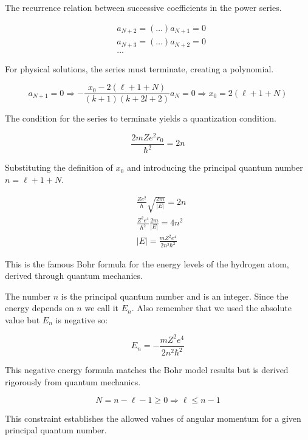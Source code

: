 The recurrence relation between successive coefficients in the power series.

\begin{align}
& a_{N+2}=(\ldots) a_{N+1}=0 \\
& a_{N+3}=(\ldots) a_{N+2}=0  \\
& \ldots
\end{align}

For physical solutions, the series must terminate, creating a polynomial.

\begin{equation}
a_{N+1}=0 \Longrightarrow-\frac{x_{0}-2(\ell+1+N)}{(k+1)(k+2 l+2)} a_{N}=0 \Longrightarrow x_{0}=2(\ell+1+N)
\end{equation}

The condition for the series to terminate yields a quantization condition.

\begin{equation}
\frac{2 m Z e^{2} r_{0}}{\hbar^{2}}=2 n
\end{equation}

Substituting the definition of $x_0$ and introducing the principal quantum number $n = \ell+1+N$.

\begin{align}
& \frac{Z e^{2}}{\hbar} \sqrt{\frac{2 m}{|E|}}=2 n \\
& \frac{Z^{2} e^{4}}{\hbar^{2}} \frac{2 m}{|E|}=4 n^{2}  \\
& |E|=\frac{m Z^{2} e^{4}}{2 n^{2} \hbar^{2}}
\end{align}

This is the famous Bohr formula for the energy levels of the hydrogen atom, derived through quantum mechanics.

The number $n$ is the principal quantum number and is an integer. Since the energy depends on $n$ we call it $E_{n}$. Also remember that we used the absolute value but $E_{n}$ is negative so:

\begin{equation}
E_{n}=-\frac{m Z^{2} e^{4}}{2 n^{2} \hbar^{2}}
\end{equation}

This negative energy formula matches the Bohr model results but is derived rigorously from quantum mechanics.

\begin{equation}
N=n-\ell-1 \geq 0 \Longrightarrow \ell \leq n-1
\end{equation}

This constraint establishes the allowed values of angular momentum for a given principal quantum number.

